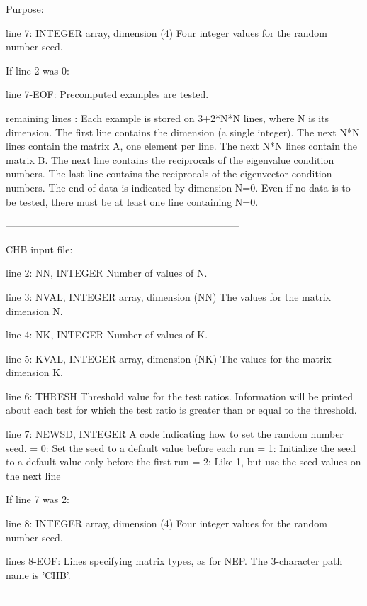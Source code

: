 \begin{DoxyParagraph}{Purpose\+: }
\begin{DoxyVerb}
 line 7: INTEGER array, dimension (4)
          Four integer values for the random number seed.

 If line 2 was 0:

 line 7-EOF: Precomputed examples are tested.

 remaining lines : Each example is stored on 3+2*N*N lines, where N is
          its dimension. The first line contains the dimension (a
          single integer). The next N*N lines contain the matrix A, one
          element per line. The next N*N lines contain the matrix B.
          The next line contains the reciprocals of the eigenvalue
          condition numbers.  The last line contains the reciprocals of
          the eigenvector condition numbers.  The end of data is
          indicated by dimension N=0.  Even if no data is to be tested,
          there must be at least one line containing N=0.

-----------------------------------------------------------------------

 CHB input file:

 line 2:  NN, INTEGER
          Number of values of N.

 line 3:  NVAL, INTEGER array, dimension (NN)
          The values for the matrix dimension N.

 line 4:  NK, INTEGER
          Number of values of K.

 line 5:  KVAL, INTEGER array, dimension (NK)
          The values for the matrix dimension K.

 line 6:  THRESH
          Threshold value for the test ratios.  Information will be
          printed about each test for which the test ratio is greater
          than or equal to the threshold.

 line 7:  NEWSD, INTEGER
          A code indicating how to set the random number seed.
          = 0:  Set the seed to a default value before each run
          = 1:  Initialize the seed to a default value only before the
                first run
          = 2:  Like 1, but use the seed values on the next line

 If line 7 was 2:

 line 8:  INTEGER array, dimension (4)
          Four integer values for the random number seed.

 lines 8-EOF:  Lines specifying matrix types, as for NEP.
          The 3-character path name is 'CHB'.

-----------------------------------------------------------------------


\end{DoxyVerb}
\end{DoxyParagraph}
